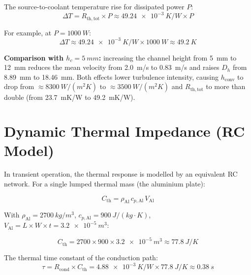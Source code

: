 \documentclass[a4paper,11pt]{article}
\begin{document}
The source-to-coolant temperature rise for dissipated power $P$:
\begin{equation}
  \Delta T = R_{\mathrm{th,tot}}\times P
           \approx \SI{49.24e-3}{K/W} \times P
\end{equation}

For example, at $P = \SI{1000}{W}$:
\begin{equation}
  \Delta T \approx \SI{49.24e-3}{K/W} \times \SI{1000}{W} \approx \SI{49.2}{K}
\end{equation}

\noindent\textbf{Comparison with $h_c = \SI{5}{mm}$:} increasing the channel height
from \SI{5}{mm} to \SI{12}{mm} reduces the mean velocity from \SI{2.0}{m/s} to
\SI{0.83}{m/s} and raises $D_h$ from \SI{8.89}{mm} to \SI{18.46}{mm}. Both effects
lower turbulence intensity, causing $h_{\mathrm{conv}}$ to drop from
$\approx\SI{8300}{W/(m^2 K)}$ to $\approx\SI{3500}{W/(m^2 K)}$ and
$R_{\mathrm{th,tot}}$ to more than double (from \SI{23.7}{mK/W} to \SI{49.2}{mK/W}).

\section{Dynamic Thermal Impedance (RC Model)}

In transient operation, the thermal response is modelled by an equivalent RC network.
For a single lumped thermal mass (the aluminium plate):

\begin{equation}
  C_{\mathrm{th}} = \rho_{\mathrm{Al}}\,c_{p,\mathrm{Al}}\,V_{\mathrm{Al}}
\end{equation}

With $\rho_{\mathrm{Al}} = \SI{2700}{kg/m^3}$,
$c_{p,\mathrm{Al}} = \SI{900}{J/(kg\cdot K)}$,
$V_{\mathrm{Al}} = L\times W\times t = \SI{3.2e-5}{m^3}$:

\begin{equation}
  C_{\mathrm{th}} = 2700 \times 900 \times \SI{3.2e-5}{m^3}
                  \approx \SI{77.8}{J/K}
\end{equation}

The thermal time constant of the conduction path:
\begin{equation}
  \tau = R_{\mathrm{cond}}\times C_{\mathrm{th}}
       = \SI{4.88e-3}{K/W} \times \SI{77.8}{J/K}
       \approx \SI{0.38}{s}
\end{equation}
\end{document}
